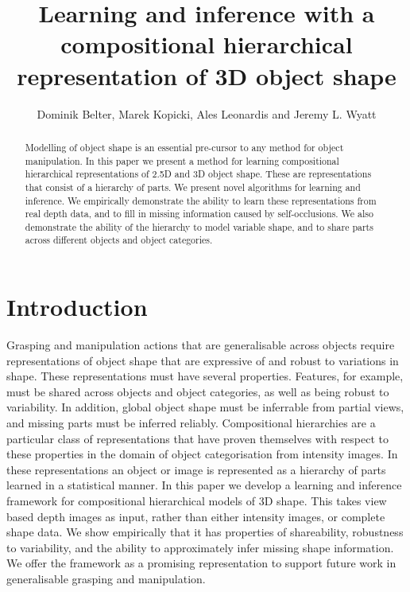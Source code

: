 \documentclass[letterpaper,10pt,conference]{ieeeconf}  %
\title{\LARGE \bf
 Learning and inference with a compositional hierarchical representation of 3D object shape
}
\author{Dominik Belter, Marek Kopicki, Ales Leonardis and Jeremy L. Wyatt%
}
\begin{document}
\maketitle
\thispagestyle{empty}
\pagestyle{empty}


\begin{abstract}
Modelling of object shape is an essential pre-cursor to any method for object manipulation. In this paper we present a method for learning compositional hierarchical representations of 2.5D and 3D object shape. These are representations that consist of a hierarchy of parts. We present novel algorithms for learning and inference. We empirically demonstrate the ability to learn these representations from real depth data, and to fill in missing information caused by self-occlusions. We also demonstrate the ability of the hierarchy to model variable shape, and to share parts across different objects and object categories.
\end{abstract}



\section{Introduction}

Grasping and manipulation actions that are generalisable across objects require representations of object shape that are expressive of and robust to variations in shape. These representations must have several properties.  Features, for example, must be shared across objects and object categories, as well as being robust to variability. In addition, global object shape must be inferrable from partial views, and missing parts must be inferred reliably. Compositional hierarchies are a particular class of representations that have proven themselves with respect to these properties in the domain of object categorisation from intensity images. In these representations an object or image is represented as a hierarchy of parts learned in a statistical manner. In this paper we develop a learning and inference framework for compositional hierarchical models of 3D shape. This takes view based depth images as input, rather than either intensity images, or complete shape data. We show empirically that it has properties of shareability, robustness to variability, and the ability to approximately infer missing shape information. We offer the framework as a promising representation to support future work in generalisable grasping and manipulation.
\end{document}
